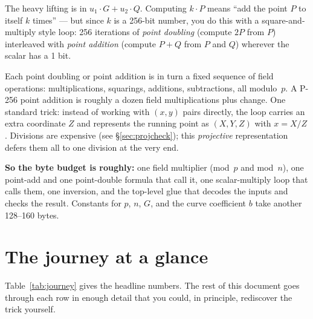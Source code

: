 \documentclass[11pt,a4paper]{article}
\begin{document}
The heavy lifting is in $u_1 \cdot G + u_2 \cdot Q$. Computing
$k \cdot P$ means ``add the point $P$ to itself $k$ times'' --- but
since $k$ is a 256-bit number, you do this with a square-and-multiply
style loop: 256 iterations of \emph{point doubling} (compute $2P$
from $P$) interleaved with \emph{point addition} (compute $P+Q$ from
$P$ and $Q$) wherever the scalar has a 1 bit.

Each point doubling or point addition is in turn a fixed sequence of
field operations: multiplications, squarings, additions, subtractions,
all modulo~$p$. A P-256 point addition is roughly a dozen field
multiplications plus change. One standard trick: instead of working
with $(x, y)$ pairs directly, the loop carries an extra coordinate
$Z$ and represents the running point as $(X, Y, Z)$ with $x = X/Z$.
Divisions are expensive (see \S\ref{sec:projcheck}); this
\emph{projective} representation defers them all to one division at
the very end.

\textbf{So the byte budget is roughly:} one field multiplier (mod~$p$
and mod~$n$), one point-add and one point-double formula that call it,
one scalar-multiply loop that calls them, one inversion, and
the top-level glue that decodes the inputs and checks the result.
Constants for $p$, $n$, $G$, and the curve coefficient $b$ take
another 128--160 bytes.

\section{The journey at a glance}

Table~\ref{tab:journey} gives the headline numbers. The rest of this
document goes through each row in enough detail that you could, in
principle, rediscover the trick yourself.
\end{document}
